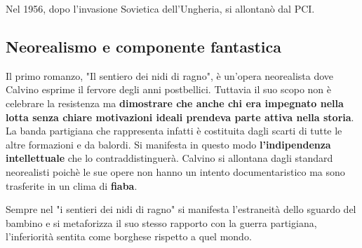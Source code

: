 \documentclass[12pt]{report}
\begin{document}
			Nel 1956, dopo l'invasione Sovietica dell'Ungheria, si allontanò dal PCI.
			
			\subsection{Neorealismo e componente fantastica}
			Il primo romanzo, "Il sentiero dei nidi di ragno", è un'opera neorealista dove Calvino esprime il fervore degli anni postbellici.
			Tuttavia il suo scopo non è celebrare la resistenza ma \textbf{dimostrare che anche chi era impegnato nella lotta senza chiare motivazioni ideali prendeva parte attiva nella storia}. La banda partigiana che rappresenta infatti è costituita dagli scarti di tutte le altre formazioni e da balordi. 
			Si manifesta in questo modo \textbf{l'indipendenza intellettuale} che lo contraddistinguerà.
			Calvino si allontana dagli standard neorealisti poichè le sue opere non hanno un intento documentaristico ma sono trasferite in un clima di \textbf{fiaba}.
			
			Sempre nel "i sentieri dei nidi di ragno" si manifesta l'estraneità dello sguardo del bambino e si metaforizza il suo stesso rapporto con la guerra partigiana, l'inferiorità sentita come borghese rispetto a quel mondo.
			
			
	
	

	
	
	
	
	
	
	
	
\end{document}
